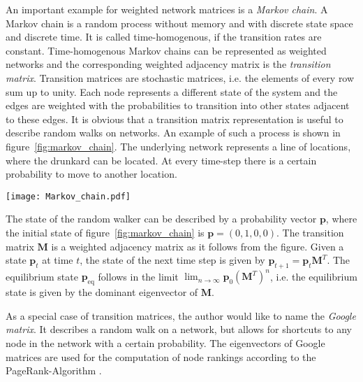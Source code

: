 An important example for weighted network matrices is a \emph{Markov chain}.
A Markov chain is a random process without memory and with discrete state space and discrete time.
It is called time-homogenous, if the transition rates are constant.
Time-homogenous Markov chains can be represented as weighted networks and the corresponding weighted adjacency matrix is the \emph{transition matrix}.
Transition matrices are stochastic matrices, i.e. the elements of every row sum up to unity.
Each node represents a different state of the system and the edges are weighted with the probabilities to transition into other states adjacent to these edges.
It is obvious that a transition matrix representation is useful to describe random walks on networks.
An example of such a process is shown in figure~\ref{fig:markov_chain}.
The underlying network represents a line of locations, where the drunkard can be located.
At every time-step there is a certain probability to move to another location.
%
\begin{SCfigure}%
\texttt{[image: Markov\_chain.pdf]}
\caption{Trajectory of a toddling drunk man as an example of a Markov chain.
At every location there is a probability for the drunkard to go left or right.
The node rightmost node is an absorbing state and could model a park bench.
Weights at arrowheads mark the transition probability.
(inspired by \citep{Aldous_book}).}
\label{fig:markov_chain}
\end{SCfigure}
%
The state of the random walker can be described by a probability vector $\mathbf{p}$, where the initial state of figure~\ref{fig:markov_chain} is $\mathbf{p}=(0,1,0,0)$.
The transition matrix $\mathbf{M}$ is a weighted adjacency matrix as it follows from the figure.
Given a state $\mathbf{p}_{t}$ at time $t$, the state of the next time step is given by $\mathbf{p}_{t+1}=\mathbf{p}_t \mathbf{M}^T$.
The equilibrium state $\mathbf{p}_\mathrm{eq}$ follows in the limit $\lim _{n\rightarrow \infty } \mathbf{p}_0 (\mathbf{M}^T)^n$, i.e. the equilibrium state is given by the dominant eigenvector of $\mathbf{M}$.

As a special case of transition matrices, the author would like to name the \emph{Google matrix}.
It describes a random walk on a network, but allows for shortcuts to any node in the network with a certain probability.
The eigenvectors of Google matrices are used for the computation of node rankings according to the PageRank-Algorithm \citep{PageRank:}.


